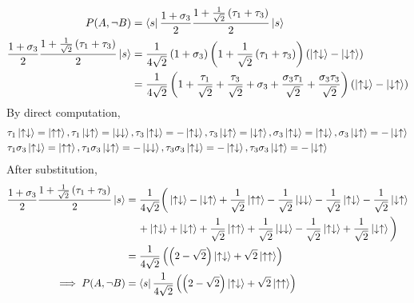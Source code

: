 \documentclass[12pt]{book} %
\numberwithin{equation}{chapter}
\def\s{\sigma}
\def\t{\tau}
\begin{document}
\begin{solbox}
\begin{align*}
P(A, \neg B)&=\bra{s}\frac{1+\s_{3}}{2}\frac{1+\frac{1}{\sqrt{2}}\left(\t_{1}+\t_{3}\right)}{2}\ket{s}\\
\frac{1+\s_{3}}{2}\frac{1+\frac{1}{\sqrt{2}}\left(\t_{1}+\t_{3}\right)}{2}\ket{s}&=\frac{1}{4\sqrt{2}}\left(1+\s_{3}\right)\left(1+\frac{1}{\sqrt{2}}\left(\t_{1}+\t_{3}\right)\right)\left(\ket{\uparrow\downarrow}-\ket{\downarrow\uparrow}\right)\\
&=\frac{1}{4\sqrt{2}}\left(1+\frac{\t_{1}}{\sqrt{2}}+\frac{\t_{3}}{\sqrt{2}}+\s_{3}+\frac{\s_{3}\t_{1}}{\sqrt{2}}+\frac{\s_{3}\t_{3}}{\sqrt{2}}\right)\left(\ket{\uparrow\downarrow}-\ket{\downarrow\uparrow}\right)\\
\end{align*}
By direct computation,
\begin{align*}
&\t_{1}\ket{\uparrow\downarrow}=\ket{\uparrow\uparrow}, \t_{1}\ket{\downarrow\uparrow}=\ket{\downarrow\downarrow}, \t_{3}\ket{\uparrow\downarrow}=-\ket{\uparrow\downarrow}, \t_{3}\ket{\downarrow\uparrow}=\ket{\downarrow\uparrow}, \s_{3}\ket{\uparrow\downarrow}=\ket{\uparrow\downarrow}, \s_{3}\ket{\downarrow\uparrow}=-\ket{\downarrow\uparrow}\\
&\t_{1}\s_{3}\ket{\uparrow\downarrow}=\ket{\uparrow\uparrow}, \t_{1}\s_{3}\ket{\downarrow\uparrow}=-\ket{\downarrow\downarrow}, \t_{3}\s_{3}\ket{\uparrow\downarrow}=-\ket{\uparrow\downarrow}, \t_{3}\s_{3}\ket{\downarrow\uparrow}=-\ket{\downarrow\uparrow}
\end{align*}
After substitution,
\begin{align*}
\frac{1+\s_{3}}{2}\frac{1+\frac{1}{\sqrt{2}}\left(\t_{1}+\t_{3}\right)}{2}\ket{s}&=\frac{1}{4\sqrt{2}}\bigg(\ket{\uparrow\downarrow}-\ket{\downarrow\uparrow}+\frac{1}{\sqrt{2}}\ket{\uparrow\uparrow}-\frac{1}{\sqrt{2}}\ket{\downarrow\downarrow}-\frac{1}{\sqrt{2}}\ket{\uparrow\downarrow}-\frac{1}{\sqrt{2}}\ket{\downarrow\uparrow}\\
&\,\,\,\,\,\,\,+\ket{\uparrow\downarrow}+\ket{\downarrow\uparrow}+\frac{1}{\sqrt{2}}\ket{\uparrow\uparrow}+\frac{1}{\sqrt{2}}\ket{\downarrow\downarrow}-\frac{1}{\sqrt{2}}\ket{\uparrow\downarrow}+\frac{1}{\sqrt{2}}\ket{\downarrow\uparrow}\bigg)\\
&=\frac{1}{4\sqrt{2}}\left(\left(2-\sqrt{2}\right)\ket{\uparrow\downarrow}+\sqrt{2}\ket{\uparrow\uparrow}\right)\\
\implies P(A, \neg B)&=\bra{s}\frac{1}{4\sqrt{2}}\left(\left(2-\sqrt{2}\right)\ket{\uparrow\downarrow}+\sqrt{2}\ket{\uparrow\uparrow}\right)\\

\end{align*}
\end{solbox}
\end{document}
